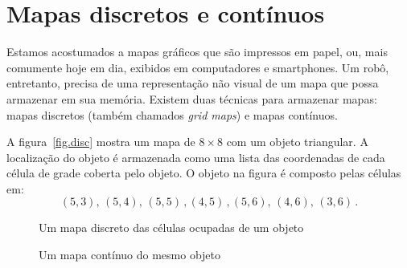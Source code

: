 \section{Mapas discretos e contínuos}\label{s.maps}

Estamos acostumados a mapas gráficos que são impressos em papel, ou, mais comumente hoje em dia, exibidos em computadores e smartphones. Um robô, entretanto, precisa de uma representação não visual de um mapa que possa armazenar em sua memória. Existem duas técnicas para armazenar mapas: mapas discretos (também chamados \emph{grid maps}) e mapas contínuos.

A figura~\ref{fig.disc} mostra um mapa de $8\times 8$ com um objeto triangular. A localização do objeto é armazenada como uma lista das coordenadas de cada célula de grade coberta pelo objeto. O objeto na figura é composto pelas células em:
\[
(5,3),\, (5,4),\, (5,5)\,, (4,5)\,, (5,6),\, (4,6),\, (3,6)\,.
\]
\begin{figure}
\begin{minipage}{.45\textwidth}
\caption{Um mapa discreto das células ocupadas de um objeto}\label{fig.disc}
\end{minipage}
\hspace{\fill}
\begin{minipage}{.45\textwidth}
\caption{Um mapa contínuo do mesmo objeto}
\label{fig.cont}
\end{minipage}
\end{figure}

